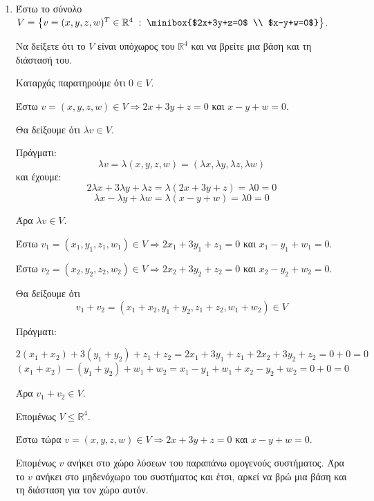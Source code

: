 \begin{enumerate}[1.]
\begin{enumerate}[i)]
\end{enumerate}

\pagebreak

\item Έστω το σύνολο $V=\left\{v=(x,y,z,w)^T\in\mathbb{R}^4 \;:\; \minibox{$2x+3y+z=0$ \\ $x-y+w=0$}\right\}$.

Να δείξετε ότι το $V$ είναι υπόχωρος του $\mathbb{R}^4$ και να βρείτε μια βάση και τη διάστασή του.

\vspace{\baselineskip}


\vspace{\baselineskip}

Καταρχάς παρατηρούμε ότι $0\in V$. 

Έστω $v=(x,y,z,w)\in V \Rightarrow 2x+3y+z=0$ και $x-y+w=0$.

Θα δείξουμε ότι $\lambda v\in V$. 

Πράγματι:
\[
\lambda v=\lambda(x,y,z,w)=(\lambda x,\lambda y, \lambda z, \lambda w)
\]
και έχουμε:
\[
2\lambda x+3\lambda y +\lambda z= \lambda(2x+3y+z)=\lambda 0=0
\]
\[
\lambda x- \lambda y +\lambda w=\lambda(x-y+w)=\lambda 0 =0
\]

Άρα $\lambda v\in V$.

Έστω $v_1=(x_1,y_1,z_1,w_1)\in V \Rightarrow 2x_1+3y_1+z_1=0$ και $x_1-y_1+w_1=0$.

Έστω $v_2=(x_2,y_2,z_2,w_2)\in V \Rightarrow 2x_2+3y_2+z_2=0$ και $x_2-y_2+w_2=0$.

Θα δείξουμε ότι \[v_1+v_2=(x_1+x_2,y_1+y_2,z_1+z_2,w_1+w_2)\in V\] 

Πράγματι:

\[2(x_1+x_2)+3(y_1+y_2)+z_1+z_2=2x_1+3y_1+z_1+2x_2+3y_2+z_2=0+0=0\]
\[(x_1+x_2)-(y_1+y_2)+w_1+w_2=x_1-y_1+w_1+x_2-y_2+w_2=0+0=0\]

Άρα $v_1+v_2\in V$.

Επομένως $V\leq \mathbb{R}^4$.

Έστω τώρα $v=(x,y,z,w)\in V \Rightarrow 2x+3y+z=0$ και $x-y+w=0$.

Επομένως $v$ ανήκει στο χώρο λύσεων του παραπάνω ομογενούς συστήματος. Άρα το $v$ ανήκει στο μηδενόχωρο του συστήματος και έτσι, αρκεί να βρώ μια βάση και τη διάσταση για τον χώρο αυτόν. 



\end{enumerate}
